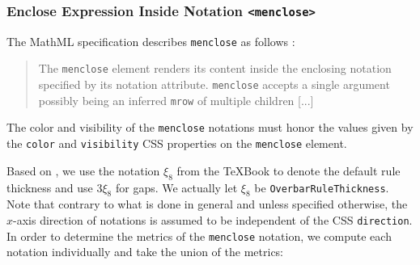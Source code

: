 \subsubsection{Enclose Expression Inside Notation {\tt <menclose>}}\label{menclose}

The MathML specification describes {\tt menclose} as follows \cite{MathML3}:
%
\begin{quote}
The {\tt menclose} element renders its content inside the enclosing notation
specified by its notation attribute. {\tt menclose} accepts a single argument
possibly being an inferred {\tt mrow} of multiple children [...]
\end{quote}

The color and visibility of the {\tt menclose} notations must honor the values
given by the {\tt color} and {\tt visibility} CSS properties on the
{\tt menclose} element.

Based on \cite{OpenFontFormat3} \cite{TeXBook}, we use the notation $\xi_8$
from the TeXBook to denote the default rule thickness and use $3\xi_8$ for gaps.
We actually let $\xi_8$ be {\tt OverbarRuleThickness}.
Note that contrary to what is done in general and unless specified otherwise,
the $x$-axis direction of notations is assumed to be independent of the CSS
{\tt direction}.
In order to determine the metrics of the {\tt menclose} notation, we
compute each notation individually and take the union of the metrics:

